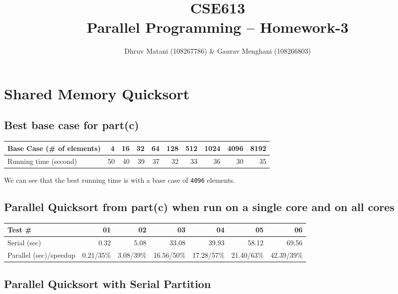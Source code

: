 \documentclass{article}
\title{CSE613\\Parallel Programming -- Homework-3}
\author{Dhruv Matani (108267786) \& Gaurav Menghani (108266803)}
\begin{document}
\maketitle

\clearpage

\tableofcontents

\clearpage

\section{Shared Memory Quicksort}

\subsection{Best base case for part(c)}

\begin{center}
  \begin{tabular}{| l | r | r | r | r | r | r | r | r | r |}
    \hline
    Base Case (\# of elements) & 4 & 16 & 32 & 64 & 128 & 512 & 1024 & 4096 & 8192 \\ \hline
    Running time (second) & 50 & 40 & 39 & 37 & 32 & 33 & 36 & 30 & 35 \\ \hline
  \end{tabular}
\end{center}

We can see that the best running time is with a base case of \texttt{4096} elements.

\subsection{Parallel Quicksort from part(c) when run on a single core and on all cores}

\begin{center}
  \begin{tabular}{| l | r | r | r | r | r | r |}
    \hline
    Test \# & 01 & 02 & 03 & 04 & 05 & 06 \\ \hline
    Serial (sec)           & 0.32 & 5.08 & 33.08 & 39.93 & 58.12 & 69.56 \\ \hline
    Parallel (sec)/speedup & 0.21/35\% & 3.08/39\% & 16.56/50\% & 17.28/57\% & 21.40/63\% & 42.39/39\% \\ \hline
  \end{tabular}
\end{center}

\subsection{Parallel Quicksort with Serial Partition}
\end{document}

